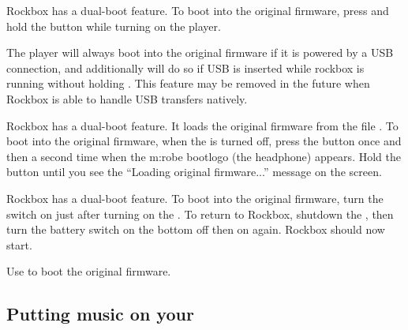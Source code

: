 {  
    {
    Rockbox has a dual-boot feature. To boot into the original firmware,
    press and hold the \ButtonLeft{} button while turning on the player.
    }

    {
    The player will always boot into the original firmware if it is powered
    by a USB connection, and additionally will do so if USB is inserted while
    rockbox is running without holding \ActionStdUsbCharge{}. This feature may
    be removed in the future when Rockbox is able to handle USB transfers 
    natively.
    }

    {
    Rockbox has a dual-boot feature. It loads the original firmware from
    the file . To boot into the original firmware,
    when the \dap{} is turned off, press the \ButtonPower{} button once and then 
    a second time when the m:robe bootlogo (the headphone) appears. Hold the
    \ButtonPower{} button until you see the ``Loading original firmware...'' 
    message on the screen.
    }

    {
    Rockbox has a dual-boot feature. To boot into the original firmware,
    turn the \ButtonHold{} switch on just after turning on the \dap{}.
    To return to Rockbox, shutdown the \dap{}, then turn the battery switch
    on the bottom off then on again. Rockbox should now start.
    }

    {
    Use \ButtonPower{} to boot the original \playerman{} firmware.
    }

  }
\subsection{Putting music on your \dap{}}


